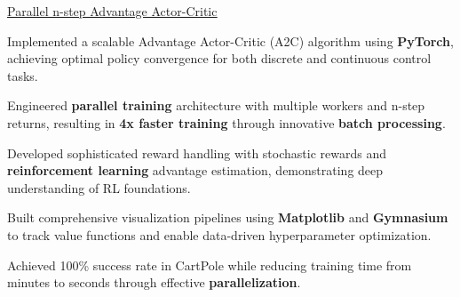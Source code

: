 \begin{rSubsection}
{\href{https://github.com/AliBakly/CartPole-A2C-reinforcement-learning}{\underline{Parallel n-step Advantage Actor-Critic} \href{Project Link}{\raisebox{-0.1\height}\faExternalLink }}}{}{}{}{}{}{}

\item Implemented a scalable Advantage Actor-Critic (A2C) algorithm using \textbf{PyTorch}, achieving optimal policy 
convergence for both discrete and continuous control tasks.

\item Engineered \textbf{parallel training} architecture with multiple workers and n-step returns, resulting in \textbf{4x faster 
training} through innovative \textbf{batch processing}.

\item Developed sophisticated reward handling with stochastic rewards and \textbf{reinforcement learning} advantage 
estimation, demonstrating deep understanding of RL foundations.

\item Built comprehensive visualization pipelines using \textbf{Matplotlib} and \textbf{Gymnasium} to track value functions 
and enable data-driven hyperparameter optimization.

\item Achieved 100\% success rate in CartPole while reducing training time from minutes to seconds through effective 
\textbf{parallelization}.

\end{rSubsection}
\vspace{-8pt}